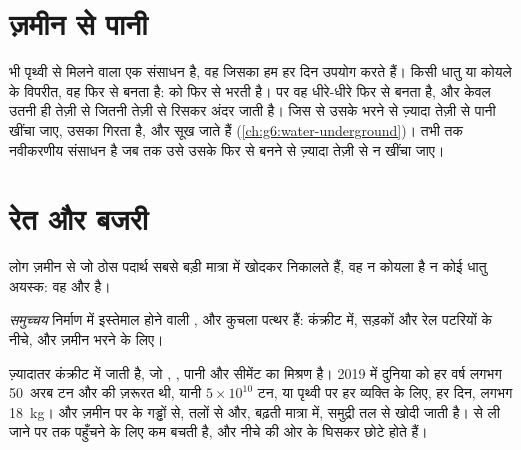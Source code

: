 \section{ज़मीन से पानी}

 भी पृथ्वी से मिलने वाला एक संसाधन है, वह जिसका हम हर दिन उपयोग करते हैं। किसी धातु
या कोयले के विपरीत, वह फिर से बनता है:   को फिर से भरती है। पर वह धीरे-धीरे
फिर से बनता है, और केवल उतनी ही तेज़ी से जितनी तेज़ी से  रिसकर अंदर जाती है। जिस 
से उसके भरने से ज़्यादा तेज़ी से पानी खींचा जाए, उसका  गिरता है, और  सूख जाते
हैं (\cref{ch:g6:water-underground})।  तभी तक नवीकरणीय संसाधन है जब तक उसे उसके
फिर से बनने से ज़्यादा तेज़ी से न खींचा जाए।

\section{रेत और बजरी}

लोग ज़मीन से जो ठोस पदार्थ सबसे बड़ी मात्रा में खोदकर निकालते हैं, वह न कोयला है न कोई
धातु अयस्क: वह  और  है।

\begin{definition}[समुच्चय]\label{def:g9:earth-resources:aggregate}
\emph{समुच्चय} निर्माण में इस्तेमाल होने वाली ,  और कुचला
पत्थर हैं: कंक्रीट में, सड़कों और रेल पटरियों के नीचे, और ज़मीन भरने के
लिए।
\end{definition}

ज़्यादातर  कंक्रीट में जाती है, जो , , पानी और सीमेंट का मिश्रण है। 2019 में दुनिया
को हर वर्ष लगभग 50~अरब टन  और  की ज़रूरत थी, यानी $5 \times 10^{10}$ टन, या
पृथ्वी पर हर व्यक्ति के लिए, हर दिन, लगभग \qty{18}{kg}।  और  ज़मीन पर के गड्ढों
से,  तलों से और, बढ़ती मात्रा में, समुद्री तल से खोदी जाती है।  से ली जाने पर  तक
पहुँचने के लिए कम  बचती है, और नीचे की ओर के   घिसकर छोटे होते
हैं।

